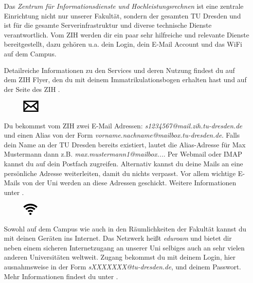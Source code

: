 
Das \textit{Zentrum für Informationsdienste und Hochleistungsrechnen} ist eine zentrale Einrichtung nicht nur unserer Fakultät, sondern der gesamten TU Dresden und ist für die gesamte Serverinfrastruktur und diverse technische Dienste verantwortlich. Vom ZIH werden dir ein paar sehr hilfreiche und relevante Dienste bereitgestellt, dazu gehören u.a. dein Login, dein E-Mail Account und das WiFi auf dem Campus.

Detailreiche Informationen zu den Services und deren Nutzung findest du auf dem ZIH Flyer, den du mit deinem Immatrikulationsbogen erhalten hast und auf der Seite des ZIH .


\begin{figure}%
  \vspace{-0.4cm}%
  \centering%
  \includegraphics[height=0.6cm]{img/icons/email.pdf}%
  \vspace{-0.4cm}%
\end{figure}

Du bekommst vom ZIH zwei E-Mail Adressen:
\textit{s1234567@mail.zih.tu-dresden.de} und einen Alias von der Form \textit{vorname.nachname@mailbox.tu-dresden.de}.
Falls dein Name an der TU Dresden bereits existiert, lautet die Alias-Adresse für Max Mustermann dann z.B. \textit{max.mustermann1@mailbox...}.
Per Webmail oder IMAP kannst du auf dein Postfach zugreifen.
Alternativ kannst du deine Mails an eine persönliche Adresse weiterleiten, damit du nichts verpasst.
Vor allem wichtige E-Mails von der Uni werden an diese Adressen geschickt. Weitere Informationen unter .


\begin{figure}%
  \vspace{-0.4cm}%
  \centering%
  \includegraphics[height=0.6cm]{img/icons/wifi.pdf}%
  \vspace{-0.4cm}%
\end{figure}

Sowohl auf dem Campus wie auch in den Räumlichkeiten der Fakultät kannst du mit deinen Geräten ins Internet.
Das Netzwerk heißt \textit{eduroam} und bietet dir neben einem sicheren Internetzugang an unserer Uni selbiges auch an sehr vielen anderen Universitäten weltweit.
Zugang bekommst du mit deinem Login, hier ausnahmsweise in der Form \textit{sXXXXXXX@tu-dresden.de}, und deinem Passwort. Mehr Informationen findest du unter .

